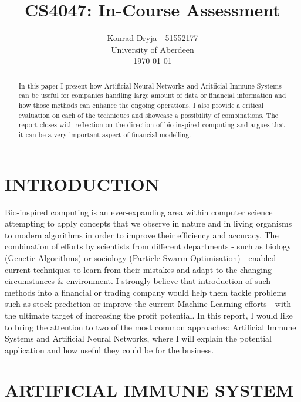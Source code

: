 \documentclass[letterpaper, 10 pt, conference]{ieeeconf}  %
\title{\LARGE \bf
CS4047: In-Course Assessment
}
\author{Konrad Dryja - 51552177 \\
  University of Aberdeen \\
  \today%
}
\begin{document}
\maketitle
\thispagestyle{empty}
\pagestyle{empty}


\begin{abstract}

  In this paper I present how Artificial Neural Networks and Aritiicial Immune Systems can be useful for companies handling large amount of data or financial information and how those methods can enhance the ongoing operations. I also provide a critical evaluation on each of the techniques and showcase a possibility of combinations. The report closes with reflection on the direction of bio-inspired computing and argues that it can be a very important aspect of financial modelling.

\end{abstract}


\section{INTRODUCTION}

Bio-inspired computing is an ever-expanding area within computer science attempting to apply concepts that we observe in nature and in living organisms to modern algorithms in order to improve their efficiency and accuracy. The combination of efforts by scientists from different departments - such as biology (Genetic Algorithms) or sociology (Particle Swarm Optimisation) - enabled current techniques to learn from their mistakes and adapt to the changing circumstances \& environment. I strongly believe that introduction of such methods into a financial or trading company would help them tackle problems such as stock prediction \cite{gunasekaran2011evaluation} or improve the current Machine Learning efforts - with the ultimate target of increasing the profit potential. In this report, I would like to bring the attention to two of the most common approaches: Artificial Immune Systems and Artificial Neural Networks, where I will explain the potential application and how useful they could be for the business.

\section{ARTIFICIAL IMMUNE SYSTEM}
\end{document}
